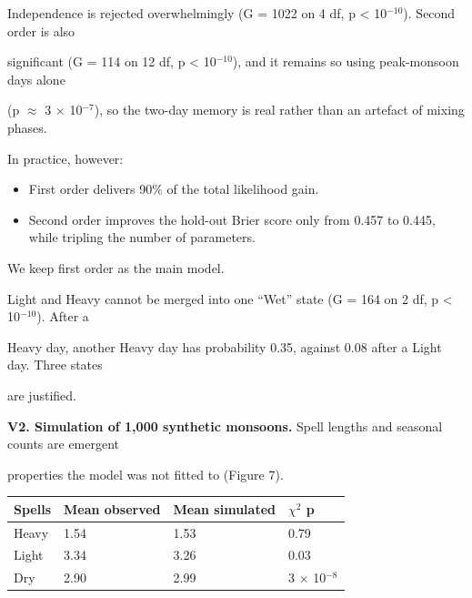 \documentclass[11pt,a4paper]{article}
\providecommand{\tightlist}{\setlength{\itemsep}{0pt}\setlength{\parskip}{0pt}}
\begin{document}
Independence is rejected overwhelmingly (G = 1022 on 4 df, p \textless{} 10$^{-10}$). Second order is also

significant (G = 114 on 12 df, p \textless{} 10$^{-10}$), and it remains so using peak-monsoon days alone

(p $\approx$ 3 $\times$ 10$^{-7}$), so the two-day memory is real rather than an artefact of mixing phases.

In practice, however:



\begin{itemize}

\tightlist

\item

  First order delivers 90\% of the total likelihood gain.

\item

  Second order improves the hold-out Brier score only from 0.457 to 0.445, while tripling the number of parameters.

\end{itemize}



We keep first order as the main model.



Light and Heavy cannot be merged into one ``Wet'' state (G = 164 on 2 df, p \textless{} 10$^{-10}$). After a

Heavy day, another Heavy day has probability 0.35, against 0.08 after a Light day. Three states

are justified.



\textbf{V2. Simulation of 1,000 synthetic monsoons.} Spell lengths and seasonal counts are emergent

properties the model was not fitted to (Figure 7).



{\def\LTcaptype{none} %

\begin{longtable}[]{@{}llll@{}}

\toprule\noalign{}

Spells & Mean observed & Mean simulated & $\chi^{2}$ p \\

\midrule\noalign{}

\endhead

\bottomrule\noalign{}

\endlastfoot

Heavy & 1.54 & 1.53 & 0.79 \\

Light & 3.34 & 3.26 & 0.03 \\

Dry & 2.90 & 2.99 & 3 $\times$ 10$^{-8}$ \\

\end{longtable}

}
\end{document}
